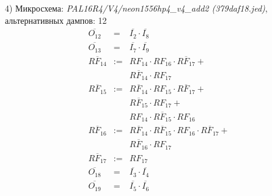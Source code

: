 \documentclass[a4paper,russian]{report}
\begin{document}
4) Микросхема: \emph{PAL16R4/V4/neon1556hp4\_v4\_add2  (379daf18.jed)}, альтернативных дампов: 12
\nopagebreak\begin{eqnarray*}
    \overline{O_{12}} & = & \overline{I_{2}} \cdotp \overline{I_{8}} \\
    \overline{O_{13}} & = & \overline{I_{7}} \cdotp \overline{I_{9}} \\
    \overline{RF_{14}} & := & RF_{14} \cdotp RF_{16} \cdotp \overline{RF_{17}} + \\
	& &  \overline{RF_{14}} \cdotp RF_{17} \\
    \overline{RF_{15}} & := & \overline{RF_{14}} \cdotp RF_{15} \cdotp \overline{RF_{17}} + \\
	& &  \overline{RF_{15}} \cdotp RF_{17} + \\
	& &  RF_{14} \cdotp \overline{RF_{15}} \cdotp RF_{16} \\
    \overline{RF_{16}} & := & \overline{RF_{14}} \cdotp \overline{RF_{15}} \cdotp RF_{16} \cdotp \overline{RF_{17}} + \\
	& &  \overline{RF_{16}} \cdotp RF_{17} \\
    \overline{RF_{17}} & := & RF_{17} \\
    \overline{O_{18}} & = & \overline{I_{3}} \cdotp \overline{I_{4}} \\
    \overline{O_{19}} & = & \overline{I_{5}} \cdotp \overline{I_{6}} \\
 \end{eqnarray*}
\pagebreak[1]
\end{document}
